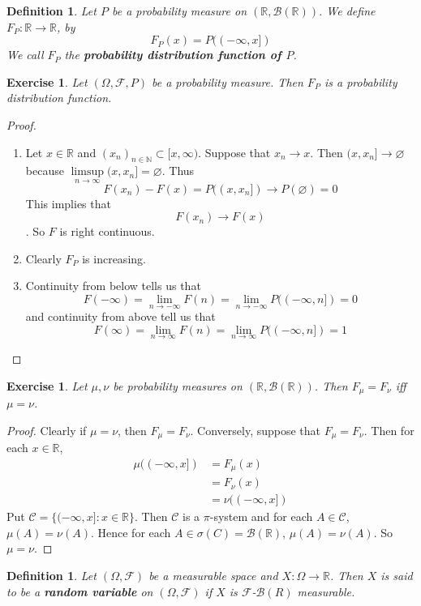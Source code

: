 \documentclass[12pt]{amsart}
\newtheorem{defn}[thm]{Definition}
\newtheorem{ex}[thm]{Exercise}
\newcommand{\sig}{\sigma}
\newcommand{\Om}{\Omega}
\newcommand{\N}{\mathbb{N}}
\newcommand{\R}{\mathbb{R}}
\newcommand{\MC}{\mathcal{C}}
\newcommand{\MB}{\mathcal{B}}
\newcommand{\MF}{\mathcal{F}}
\begin{document}
\begin{defn}
Let $P $ be a probability measure on $(\R, \MB(\R))$. We define $F_P: \R \rightarrow \R$, by $$F_P(x) = P((-\infty, x])$$ We call $F_P$ the \textbf{probability distribution function of $P$}.
\end{defn}

\begin{ex}
Let $(\Om, \MF, P)$ be a probability measure. Then $F_P$ is a probability distribution function.
\end{ex}

\begin{proof}
\begin{enumerate}
\item Let $x \in \R$ and $(x_n)_{n \in \N} \subset [x, \infty)$. Suppose that $x_n \rightarrow x$. Then $(x, x_n] \rightarrow \varnothing$ because $\limsup\limits_{n \rightarrow \infty} (x,x_n] = \varnothing$. Thus $$F(x_n) - F(x) = P((x, x_n]) \rightarrow P(\varnothing) = 0$$This implies that $$F(x_n) \rightarrow F(x)$$. So $F$ is right continuous.
\item Clearly $F_P$ is increasing.
\item Continuity from below tells us that $$F(-\infty) = \lim_{n \rightarrow -\infty}F(n) = \lim_{n \rightarrow -\infty}P((-\infty,n]) = 0$$ and continuity from above tell us that $$F(\infty)  = \lim_{n \rightarrow \infty}F(n) = \lim_{n \rightarrow \infty}P((-\infty, n]) = 1$$ 
\end{enumerate}
\end{proof}

\begin{ex}
Let $\mu, \nu$ be probability measures on $(\R, \MB(\R))$. Then $F_{\mu} = F_{\nu}$ iff $\mu = \nu$.  
\end{ex}

\begin{proof}
Clearly if $\mu = \nu$, then $F_{\mu} = F_{\nu}$. Conversely, suppose that $F_{\mu} = F_{\nu}$. Then for each $x \in \R$, 
\begin{align*}
\mu((-\infty,x]) 
&= F_{\mu}(x) \\
&= F_{\nu}(x)  \\
&= \nu((-\infty,x])
\end{align*}
Put $\MC = \{(-\infty,x]:x \in \R\} $. Then $\MC$ is a $\pi$-system and for each $A \in \MC$, $\mu(A) = \nu(A)$. Hence for each $A \in \sig(C) = \MB(\R)$, $\mu(A) = \nu(A)$. So $\mu = \nu$. 
\end{proof}

\begin{defn}
Let $(\Om, \MF)$ be a measurable space and $X:\Om \rightarrow \R$. Then $X$ is said to be a \textbf{random variable} on $(\Om, \MF)$ if $X$ is $\MF$-$\MB(R)$ measurable. 
\end{defn}
\end{document}
